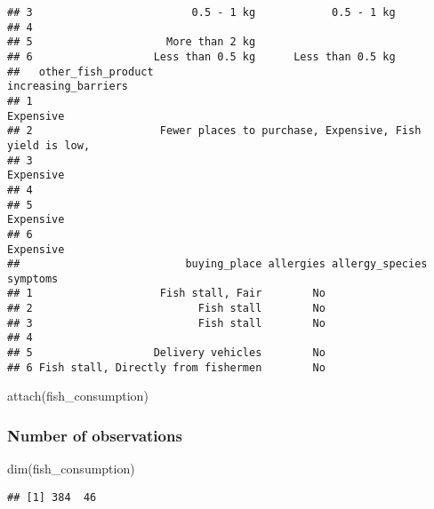 \documentclass[
]{article}
\newenvironment{Shaded}{\begin{snugshade}}{\end{snugshade}}
\newcommand{\FunctionTok}[1]{\textcolor[rgb]{0.00,0.00,0.00}{#1}}
\newcommand{\NormalTok}[1]{#1}
\begin{document}
\begin{verbatim}
## 3                         0.5 - 1 kg            0.5 - 1 kg                
## 4                                                                         
## 5                     More than 2 kg                                      
## 6                   Less than 0.5 kg      Less than 0.5 kg                
##   other_fish_product                                      increasing_barriers
## 1                                                                   Expensive
## 2                    Fewer places to purchase, Expensive, Fish yield is low, 
## 3                                                                   Expensive
## 4                                                                            
## 5                                                                   Expensive
## 6                                                                   Expensive
##                          buying_place allergies allergy_species symptoms
## 1                    Fish stall, Fair        No                         
## 2                          Fish stall        No                         
## 3                          Fish stall        No                         
## 4                                                                       
## 5                   Delivery vehicles        No                         
## 6 Fish stall, Directly from fishermen        No
\end{verbatim}

\begin{Shaded}
\begin{Highlighting}[]
\FunctionTok{attach}\NormalTok{(fish\_consumption)}
\end{Highlighting}
\end{Shaded}

\hypertarget{number-of-observations}{%
\subsubsection{Number of observations}\label{number-of-observations}}

\begin{Shaded}
\begin{Highlighting}[]
\FunctionTok{dim}\NormalTok{(fish\_consumption)}
\end{Highlighting}
\end{Shaded}

\begin{verbatim}
## [1] 384  46
\end{verbatim}
\end{document}
